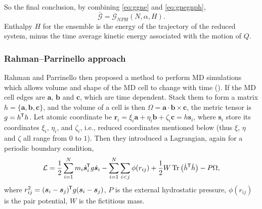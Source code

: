 So the final conclusion, by combining \eqref{eq:ggne} and \eqref{eq:gnegnph},
\begin{equation}
	\bar{\mathscr{G}} = \mathscr{G}_{NPH}(N, \alpha, H).
\end{equation}
Enthalpy $H$ for the ensemble is the energy of the trajectory of the reduced system,
minus the time average kinetic energy associated with the motion of $Q$.


\subsubsection{Rahman--Parrinello approach}
\label{sssec:rpa}

Rahman and Parrinello then proposed a method to perform
MD simulations which allows volume and shape of the MD cell
to change with time (\cite{Parrinello:1980kx}).
If the MD cell edges are $\bm{a}$, $\bm{b}$
and $\bm{c}$, which are time dependent. Stack them to form a
matrix $h = \{ \bm{a}, \bm{b}, \bm{c} \}$, and the volume of a cell
is then $\Omega = \bm{a} \cdot \bm{b} \times \bm{c}$, the metric
tensor is $g = h^{\mkern-1.5mu\mathsf{T}} h$. Let atomic coordinate be
$\bm{r}_i = \xi_i \bm{a} + \eta_i \bm{b}
	+ \zeta_i \bm{c} = h \bm{s}_i$, where $\bm{s}_i$ store its coordinates
$\xi_i$, $\eta_i$, and $\zeta_i$, i.e., reduced coordinates mentioned below (thus
$\xi$, $\eta$ and $\zeta$ all range from $0$ to $1$).
Then they introduced a Lagrangian, again for a periodic boundary condition,
\begin{equation}\label{eq:rplag}
	\mathcal{L} = \frac{ 1 }{ 2 } \sum_{i=1}^{N} m_i \dot{ \bm{s} }_i ^{\mkern-1.5mu\mathsf{T}}
	g \dot{ \bm{s} }_i - \sum_{i=1}^{N} \sum_{i<j} \phi (r_{ij}) +
	\frac{ 1 }{ 2 } W \Tr \big(\dot{h} ^{\mkern-1.5mu\mathsf{T}} \dot{h} \big) - P \Omega,
\end{equation}
where $r_{ij}^2 = (\bm{s}_i - \bm{s}_j)^{\mkern-1.5mu\mathsf{T}} g (\bm{s}_i - \bm{s}_j)$,
$P$ is the external hydrostatic pressure, $\phi(r_{ij})$ is the pair
potential, $W$ is the fictitious mass.

